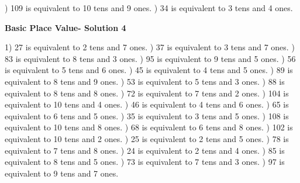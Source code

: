 \documentclass{article}%
\begin{document}
) 109 is equivalent to  10 tens and 9 ones.%
) 34 is equivalent to  3 tens and 4 ones.%
\newline%
\newpage%
\large%
\begin{center}%
\textbf{Basic Place Value- Solution 4}%
\newline%
\end{center} \normalsize%
1) 27 is equivalent to  2 tens and 7 ones.%
) 37 is equivalent to  3 tens and 7 ones.%
) 83 is equivalent to  8 tens and 3 ones.%
) 95 is equivalent to  9 tens and 5 ones.%
) 56 is equivalent to  5 tens and 6 ones.%
) 45 is equivalent to  4 tens and 5 ones.%
) 89 is equivalent to  8 tens and 9 ones.%
) 53 is equivalent to  5 tens and 3 ones.%
) 88 is equivalent to  8 tens and 8 ones.%
) 72 is equivalent to  7 tens and 2 ones.%
) 104 is equivalent to  10 tens and 4 ones.%
) 46 is equivalent to  4 tens and 6 ones.%
) 65 is equivalent to  6 tens and 5 ones.%
) 35 is equivalent to  3 tens and 5 ones.%
) 108 is equivalent to  10 tens and 8 ones.%
) 68 is equivalent to  6 tens and 8 ones.%
) 102 is equivalent to  10 tens and 2 ones.%
) 25 is equivalent to  2 tens and 5 ones.%
) 78 is equivalent to  7 tens and 8 ones.%
) 24 is equivalent to  2 tens and 4 ones.%
) 85 is equivalent to  8 tens and 5 ones.%
) 73 is equivalent to  7 tens and 3 ones.%
) 97 is equivalent to  9 tens and 7 ones.%
\end{document}
